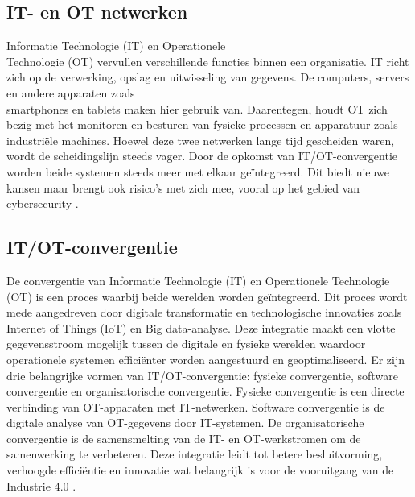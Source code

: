 \subsection{IT- en OT netwerken}
Informatie Technologie (IT) en Operationele \\Technologie (OT) vervullen verschillende functies binnen een organisatie. IT richt zich op de verwerking, opslag en 
uitwisseling van gegevens. De computers, servers en andere apparaten zoals \\smartphones en tablets maken hier gebruik van. Daarentegen, houdt OT zich bezig met het 
monitoren en besturen van fysieke processen en apparatuur zoals industriële machines. Hoewel deze twee netwerken lange tijd gescheiden waren, 
\\wordt de scheidingslijn steeds vager. Door de opkomst van IT/OT-convergentie worden beide systemen steeds meer met elkaar geïntegreerd. Dit biedt nieuwe kansen
maar brengt ook risico’s met zich mee, vooral op het gebied van cybersecurity \autocite{onlogic2023}.

\subsection{IT/OT-convergentie}
De convergentie van Informatie Technologie (IT) en Operationele Technologie (OT) is een proces waarbij beide werelden worden geïntegreerd. 
Dit proces wordt mede aangedreven door digitale transformatie en technologische innovaties zoals Internet of Things (IoT) en Big data-analyse. 
Deze integratie maakt een vlotte gegevensstroom mogelijk tussen de digitale en fysieke werelden
waardoor operationele systemen efficiënter worden aangestuurd en geoptimaliseerd. Er zijn drie belangrijke vormen van IT/OT-convergentie: fysieke convergentie, 
software convergentie en organisatorische convergentie. Fysieke convergentie is een directe verbinding van OT-apparaten met IT-netwerken. Software convergentie is 
de digitale analyse van OT-gegevens door IT-systemen. De organisatorische convergentie is de samensmelting van de IT- en OT-werkstromen om de samenwerking te verbeteren.
Deze integratie leidt tot betere besluitvorming, verhoogde efficiëntie en innovatie wat belangrijk is voor de vooruitgang van de Industrie 4.0 \autocite{maleh2021ot,paloaltonetworks2023}.

